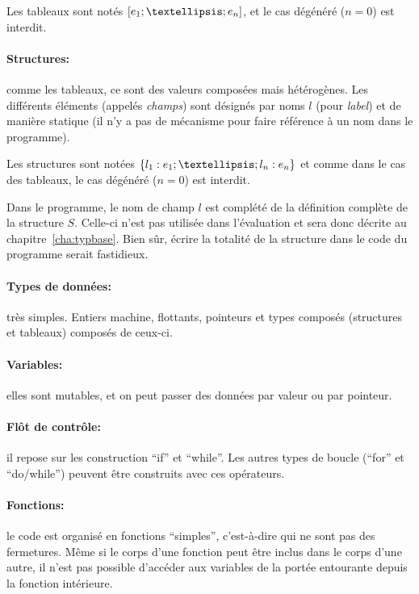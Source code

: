 Les tableaux sont notés $\eArray{e_1; …; e_n}$, et le cas dégénéré ($n = 0$) est
interdit.

\paragraph{Structures:} comme les tableaux, ce sont des valeurs composées mais
hétérogènes. Les différents éléments (appelés \emph{champs}) sont désignés par
noms $l$ (pour \emph{label}) et de manière statique (il n'y a pas de mécanisme
pour faire référence à un nom dans le programme).

Les structures sont notées $\eStruct{ l_1 : e_1 ; … ; l_n : e_n }$ et comme dans le
cas des tableaux, le cas dégénéré ($n = 0$) est interdit.

Dans le programme, le nom de champ $l$ est complété de la définition complète de
la structure $S$. Celle-ci n'est pas utilisée dans l'évaluation et sera donc
décrite au chapitre~\ref{cha:typbase}. Bien sûr, écrire la totalité de la
structure dans le code du programme serait fastidieux.

\paragraph{Types de données:} très simples. Entiers machine, flottants,
pointeurs et types composés (structures et tableaux) composés de ceux-ci.

\paragraph{Variables:} elles sont mutables, et on peut passer des données par
valeur ou par pointeur.

\paragraph{Flôt de contrôle:} il repose sur les construction ``if'' et
``while''. Les autres types de boucle (``for'' et ``do/while'') peuvent être
construits avec ces opérateurs.

\paragraph{Fonctions:} le code est organisé en fonctions ``simples'',
c'est-à-dire qui ne sont pas des fermetures. Même si le corps
d'une fonction peut être inclus dans le corps d'une autre, il n'est pas possible
d'accéder aux variables de la portée entourante depuis la fonction intérieure.

